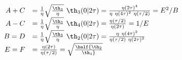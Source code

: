\begin{equation}
  \begin{array}{rl}
A+C &= {1\over \eta} \sqrt{\th_3\over\eta} ~\th_3(0|2\tau) 
    = {\eta(2\tau)^4 \over\eta~\eta(4\tau)^2 ~\eta(\tau/2)}
    = E^2/B \\
A-C &= {1\over \eta} \sqrt{\th_3\over\eta} ~\th_4(0|2\tau) 
    = {\eta(\tau/2) \over\eta(2\tau)}= 1/E \\
B = D &=  {1\over \eta} \sqrt{\th_3\over\eta} ~\th_2(0|2\tau)  = {\eta
  ~\eta(4\tau)^2 \over \eta(\tau/2) ~\eta(2\tau)^2 } \\
E = F &= {\eta(2\tau) \over \eta(\tau/2)} = \sqrt{\half {\th_2\over\th_4}}
  \end{array}
\end{equation}

